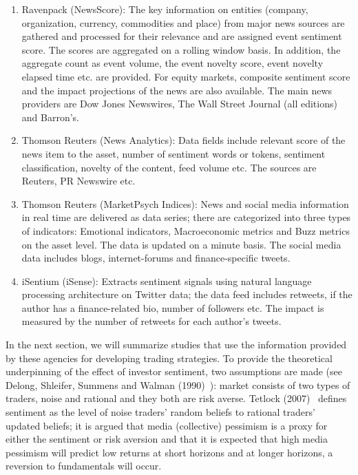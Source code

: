 \begin{enumerate}[--]
\item Ravenpack (NewsScore): The key information on entities (company, organization, currency, commodities and place) from major news sources are gathered and processed for their relevance and are assigned event sentiment score. The scores are aggregated on a rolling window basis. In addition, the aggregate count as event volume, the event novelty score, event novelty elapsed time etc. are provided. For equity markets, composite sentiment score and the impact projections of the news are also available. The main news providers are Dow Jones Newswires, The Wall Street Journal (all editions) and Barron's. 

\item Thomson Reuters (News Analytics): Data fields include relevant score of the news item to the asset, number of sentiment words or tokens, sentiment classification, novelty of the content, feed volume etc. The sources are Reuters, PR Newswire etc. 

\item Thomson Reuters (MarketPsych Indices): News and social media information in real time are delivered as data series; there are categorized into three types of indicators: Emotional indicators, Macroeconomic metrics and Buzz metrics on the asset level. The data is updated on a minute basis. The social media data includes blogs, internet-forums and finance-specific tweets.

\item iSentium (iSense): Extracts sentiment signals using natural language processing architecture on Twitter data; the data feed includes retweets, if the author has a finance-related bio, number of followers etc. The impact is measured by the number of retweets for each author's tweets. 
\end{enumerate}


In the next section, we will summarize studies that use the information provided by these agencies for developing trading strategies. To provide the theoretical underpinning of the effect of investor sentiment, two assumptions are made (see Delong, Shleifer, Summens and Walman (1990)~\cite{ssw}): market consists of two types of traders, noise and rational and they both are risk averse. Tetlock (2007)~\cite{tetlock2007giving} defines sentiment as the level of noise traders' random beliefs to rational traders' updated beliefs; it is argued that media (collective) pessimism is a proxy for either the sentiment or risk aversion and that it is expected that high media pessimism will predict low returns at short horizons and at longer horizons, a reversion to fundamentals will occur. 



